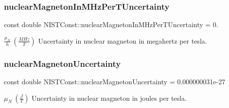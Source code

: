 \subsubsection{\texorpdfstring{nuclear\+Magneton\+In\+M\+Hz\+Per\+T\+Uncertainty}{nuclearMagnetonInMHzPerTUncertainty}}
{\footnotesize\ttfamily const double N\+I\+S\+T\+Const\+::nuclear\+Magneton\+In\+M\+Hz\+Per\+T\+Uncertainty = 0.}

$\frac{\mu_N}{h} \ (\frac{MHz}{T})$ Uncertainty in nuclear magneton in megahertz per tesla. \mbox{\label{group___n_i_s_t_const-_nuclear_magneton_ga1f693f4e6c1d8f771594a847e185b072}} 
\subsubsection{\texorpdfstring{nuclear\+Magneton\+Uncertainty}{nuclearMagnetonUncertainty}}
{\footnotesize\ttfamily const double N\+I\+S\+T\+Const\+::nuclear\+Magneton\+Uncertainty = 0.\+000000031e-\/27}

$\mu_N \ (\frac{J}{T})$ Uncertainty in nuclear magneton in joules per tesla. 
